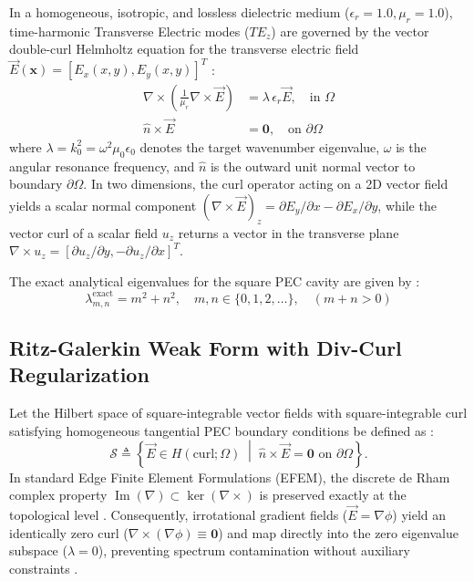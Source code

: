 \documentclass[preprint,12pt]{elsarticle}
\begin{document}
In a homogeneous, isotropic, and lossless dielectric medium ($\epsilon_r = 1.0, \mu_r = 1.0$), time-harmonic Transverse Electric modes ($TE_z$) are governed by the vector double-curl Helmholtz equation for the transverse electric field $\vec{E}(\mathbf{x}) = [E_x(x,y), E_y(x,y)]^T$ \cite{monk2003finite, ortiz2023tese}:
\begin{align}
\nabla \times \left( \frac{1}{\mu_r} \nabla \times \vec{E} \right) &= \lambda \, \epsilon_r \vec{E}, \quad \text{in } \Omega \label{eq:helmholtz_strong} \\
\hat{n} \times \vec{E} &= \mathbf{0}, \quad \text{on } \partial\Omega \label{eq:pec_boundary}
\end{align}
where $\lambda = k_0^2 = \omega^2 \mu_0 \epsilon_0$ denotes the target wavenumber eigenvalue, $\omega$ is the angular resonance frequency, and $\hat{n}$ is the outward unit normal vector to boundary $\partial\Omega$. In two dimensions, the curl operator acting on a 2D vector field yields a scalar normal component $(\nabla \times \vec{E})_z = \partial E_y/\partial x - \partial E_x/\partial y$, while the vector curl of a scalar field $u_z$ returns a vector in the transverse plane $\nabla \times u_z = [\partial u_z/\partial y, -\partial u_z/\partial x]^T$.

The exact analytical eigenvalues for the square PEC cavity are given by \cite{harrington2001time}:
\begin{equation}
\lambda_{m,n}^{\mathrm{exact}} = m^2 + n^2, \quad m,n \in \{0, 1, 2, \dots\}, \quad (m+n > 0)
\label{eq:analytical_eigenvalues}
\end{equation}

\subsection{Ritz-Galerkin Weak Form with Div-Curl Regularization}
\label{subsec:weak_form_regularization}
Let the Hilbert space of square-integrable vector fields with square-integrable curl satisfying homogeneous tangential PEC boundary conditions be defined as \cite{monk2003finite, bossavit1998computational}:
\begin{equation}
\mathcal{S} \triangleq \left\{ \vec{E} \in H(\mathrm{curl}; \Omega) \;\middle|\; \hat{n} \times \vec{E} = \mathbf{0} \text{ on } \partial\Omega \right\}.
\label{eq:hilbert_space_S}
\end{equation}
In standard Edge Finite Element Formulations (EFEM), the discrete de Rham complex property $\operatorname{Im}(\nabla) \subset \ker(\nabla \times)$ is preserved exactly at the topological level \cite{monk2003finite, bossavit1990spurious}. Consequently, irrotational gradient fields ($\vec{E} = \nabla \phi$) yield an identically zero curl ($\nabla \times (\nabla \phi) \equiv \mathbf{0}$) and map directly into the zero eigenvalue subspace ($\lambda = 0$), preventing spectrum contamination without auxiliary constraints \cite{monk2003finite, boffi1999computational}.
\end{document}
